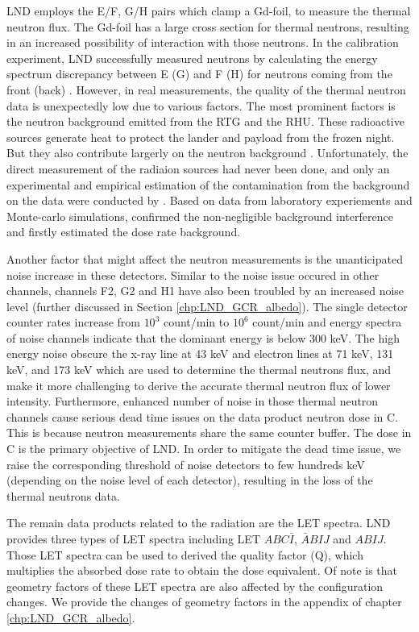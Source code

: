 \ac{LND} employs the E/F, G/H pairs which clamp a Gd-foil, to measure the thermal neutron flux. The Gd-foil has a large cross section for thermal neutrons, resulting in an increased possibility of interaction with those neutrons. In the calibration experiment, \ac{LND} successfully measured neutrons by calculating the energy spectrum discrepancy between E (G) and F (H) for neutrons coming from the front (back) \citet{Wimmer2020SSRv}.
However, in real measurements, the quality of the thermal neutron data is unexpectedly low due to various factors. The most prominent factors is the neutron background emitted from the \ac{RTG} and the \ac{RHU}. These radioactive sources generate heat to protect the lander and payload from the frozen night. But they also contribute largerly on the neutron background \citep{Zhang2020SciAdv}. Unfortunately, the direct measurement of the radiaion sources had never been done, and only an experimental and empirical estimation of the contamination from the background on the data were conducted by \citet{Hou2020-LNDbackground}. Based on data from laboratory experiements and Monte-carlo simulations, \citet{Hou2020-LNDbackground} confirmed the non-negligible background interference and firstly estimated the dose rate background. 

Another factor that might affect the neutron measurements is the unanticipated noise increase in these detectors. Similar to the noise issue occured in other channels, channels F2, G2 and H1 have also been troubled by an increased noise level (further discussed in Section \ref{chp:LND_GCR_albedo}). The single detector counter rates increase from $10^3$ count/min to $10^6$ count/min and energy spectra of noise channels indicate that the dominant energy is below 300 keV.
The high energy noise obscure the x-ray line at 43 keV and electron lines at 71 keV, 131 keV, and 173 keV which are used to determine the thermal neutrons flux, and make it more challenging to derive the accurate thermal neutron flux of lower intensity.
Furthermore, enhanced number of noise in those thermal neutron channels cause serious dead time issues on the data product neutron dose in C. This is because neutron measurements share the same counter buffer. The dose in C is the primary objective of \ac{LND}. In order to mitigate the dead time issue, we raise the corresponding threshold of noise detectors to few hundreds keV (depending on the noise level of each detector), resulting in the loss of the thermal neutrons data.


The remain data products related to the radiation are the \ac{LET} spectra. \ac{LND} provides three types of \ac{LET} spectra including \ac{LET} $ABC\bar{I}$, $\bar{A}BIJ$ and $ABIJ$. Those \ac{LET} spectra can be used to derived the quality factor (Q), which multiplies the absorbed dose rate to obtain the dose equivalent.
Of note is that geometry factors of these \ac{LET} spectra are also affected by the configuration changes. We provide the changes of geometry factors in the appendix of chapter \ref{chp:LND_GCR_albedo}.

